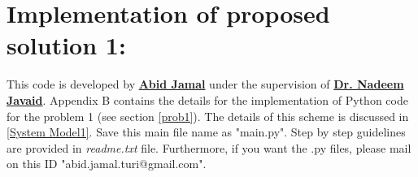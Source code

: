 \newpage
\section{Implementation of proposed solution 1:}\label{implementation_1}
This code is developed by {\href{https://sites.google.com/view/abidjamal/home?authuser=2}{\textbf{Abid Jamal}}} under the supervision of {\href{www.njavaid.com}{\textbf{Dr. Nadeem Javaid}}}.
Appendix B contains the details for the implementation of Python code for the problem 1 (see section \ref{prob1}). The details of this scheme is discussed in \ref{System Model1}. Save this main file name as "main.py". Step by step guidelines are provided in \textit{readme.txt} file. Furthermore, if you want the .py files, please mail on this ID "abid.jamal.turi@gmail.com".\par

